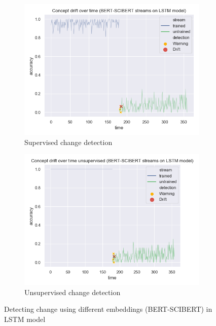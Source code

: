 \documentclass[12pt]{extreport}
\begin{document}
\begin{figure}[H]
\centering
\begin{subfigure}{.5\textwidth}
  \centering
  \includegraphics[width=\linewidth]{assets/detecting-change/diff_embed_lstm_wos_1_BERT_SCIBERT.png}
  \caption{Supervised change detection}
  \label{fig:lstm-diff-embed-super-B-S}
\end{subfigure}%
\begin{subfigure}{.5\textwidth}
  \centering
  \includegraphics[width=\linewidth]{assets/detecting-change/diff_embed_lstm_wos_1_BERT_SCIBERT_unsupervised.png}
  \caption{Unsupervised change detection}
  \label{fig:lstm-diff-embed-unsuper-B-S}
\end{subfigure}
\caption{Detecting change using different embeddings (BERT-SCIBERT) in LSTM model}
\label{fig:lstm-diff-embed-B-S}
\end{figure}
\end{document}
